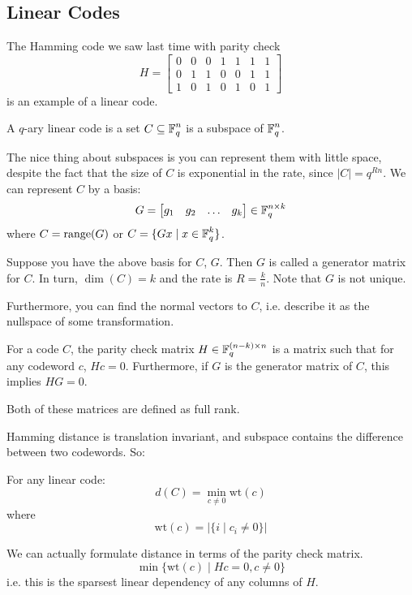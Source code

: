 \subsection{Linear Codes}
The Hamming code we saw last time with parity check
\[ H = \begin{bmatrix}
    0 & 0 & 0 & 1 & 1 & 1 & 1 \\ 0 & 1 & 1 & 0 & 0 & 1 & 1 \\ 1 & 0 & 1 & 0 & 1 & 0 & 1
\end{bmatrix} \]
is an example of a linear code.

\begin{definition}
    A $q$-ary linear code is a set $C \subseteq \operatorname{\mathbb{F}}_q^n$ is a subspace of $\operatorname{\mathbb{F}}_q^n$.
\end{definition}

The nice thing about subspaces is you can represent them with little space, despite the fact that the size of $C$ is exponential in the rate, since $|C| = q^{Rn}$.
We can represent $C$ by a basis:
\[ G = \begin{bmatrix}
    g_1 & g_2 & \dots & g_k
\end{bmatrix} \in \operatorname{\mathbb{F}}_q^{n \times k} \]
where $C = \operatorname{range}(G)$ or $C = \{G x \mid x \in \operatorname{\mathbb{F}}_q^k\}$.

\begin{definition}
    Suppose you have the above basis for $C$, $G$. Then $G$ is called a generator matrix for $C$.
    In turn, $\dim(C) = k$ and the rate is $R = \frac{k}{n}$. Note that $G$ is not unique.
\end{definition}
Furthermore, you can find the normal vectors to $C$, i.e. describe it as the nullspace of some transformation.
\begin{definition}
    For a code $C$, the parity check matrix $H \in \operatorname{\mathbb{F}}_{q}^{(n - k) \times n}$ is a matrix such that for any codeword $c$, $Hc = 0$.
    Furthermore, if $G$ is the generator matrix of $C$, this implies $HG = 0$.
\end{definition}
Both of these matrices are defined as full rank.

Hamming distance is translation invariant, and subspace contains the difference between two codewords. So:
\begin{theorem}
    For any linear code:
    \[ d(C) = \min_{c \neq 0} \text{wt}(c) \]
    where
    \[ \text{wt}(c) = |\{i \mid c_i \neq 0\}| \]
\end{theorem}

We can actually formulate distance in terms of the parity check matrix.
\[ \min\{ \text{wt}(c) \mid Hc = 0, c \neq 0 \} \]
i.e. this is the sparsest linear dependency of any columns of $H$.

